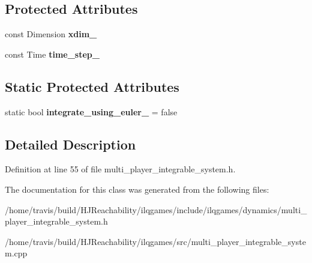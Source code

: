 \subsection*{Protected Attributes}
\begin{DoxyCompactItemize}
\item 
const Dimension {\bfseries xdim\+\_\+}\hypertarget{classilqgames_1_1_multi_player_integrable_system_ad6f5958f0f51492aa1d368765f417a19}{}\label{classilqgames_1_1_multi_player_integrable_system_ad6f5958f0f51492aa1d368765f417a19}

\item 
const Time {\bfseries time\+\_\+step\+\_\+}\hypertarget{classilqgames_1_1_multi_player_integrable_system_adbd2c27a82e441fab50201f583a869f2}{}\label{classilqgames_1_1_multi_player_integrable_system_adbd2c27a82e441fab50201f583a869f2}

\end{DoxyCompactItemize}
\subsection*{Static Protected Attributes}
\begin{DoxyCompactItemize}
\item 
static bool {\bfseries integrate\+\_\+using\+\_\+euler\+\_\+} = false\hypertarget{classilqgames_1_1_multi_player_integrable_system_a45d12b2d86a80f04fac29bd88eb8179a}{}\label{classilqgames_1_1_multi_player_integrable_system_a45d12b2d86a80f04fac29bd88eb8179a}

\end{DoxyCompactItemize}


\subsection{Detailed Description}


Definition at line 55 of file multi\+\_\+player\+\_\+integrable\+\_\+system.\+h.



The documentation for this class was generated from the following files\+:\begin{DoxyCompactItemize}
\item 
/home/travis/build/\+H\+J\+Reachability/ilqgames/include/ilqgames/dynamics/multi\+\_\+player\+\_\+integrable\+\_\+system.\+h\item 
/home/travis/build/\+H\+J\+Reachability/ilqgames/src/multi\+\_\+player\+\_\+integrable\+\_\+system.\+cpp\end{DoxyCompactItemize}
